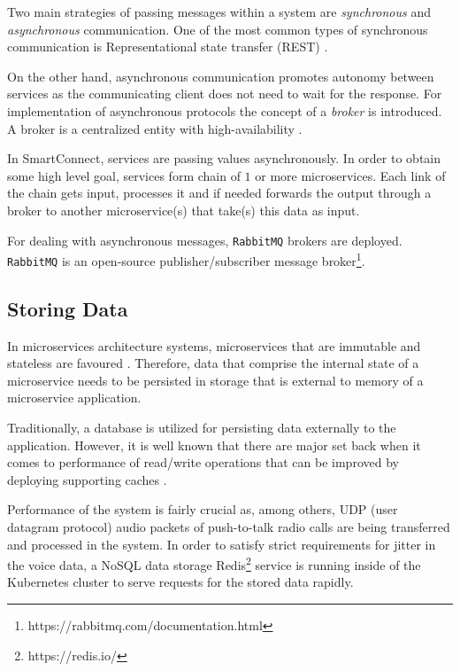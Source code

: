 Two main strategies of passing messages within a system are \textit{synchronous} and \textit{asynchronous} communication. One of the most common types of synchronous communication is Representational state transfer (REST) \cite{indrasiri2018microservices}.

On the other hand, asynchronous communication promotes autonomy between services as the communicating client does not need to wait for the response. 
For implementation of asynchronous protocols the concept of a \textit{broker} is introduced. A broker is a centralized entity with high-availability \cite{indrasiri2018microservices}.

In SmartConnect, services are passing values asynchronously. In order to obtain some high level goal, services form chain of $1$ or more microservices. Each link of the chain gets input, processes it and if needed forwards the output through a broker to another microservice(s) that take(s) this data as input.

For dealing with asynchronous messages, \texttt{RabbitMQ} brokers are deployed. 
\texttt{RabbitMQ} is an open-source publisher/subscriber message broker\footnote{https://rabbitmq.com/documentation.html}.

\subsection{Storing Data}
\label{architecture:caching}
In microservices architecture systems, microservices that are immutable and stateless are favoured \cite{indrasiri2018microservices}. 
Therefore, data that comprise the internal state of a microservice needs to be persisted in storage that is external to memory of a microservice application.

Traditionally, a database is utilized for persisting data externally to the application. However, it is well known that there are major set back when it comes to performance of read/write operations that can be improved by deploying supporting caches \cite{elhardt1984database}.

Performance of the system is fairly crucial as, among others, UDP (user datagram protocol) audio packets of push-to-talk radio calls are being transferred and processed in the system. 
In order to satisfy strict requirements for jitter in the voice data, a NoSQL data storage Redis\footnote{https://redis.io/} service is running inside of the Kubernetes cluster to serve requests for the stored data rapidly.

